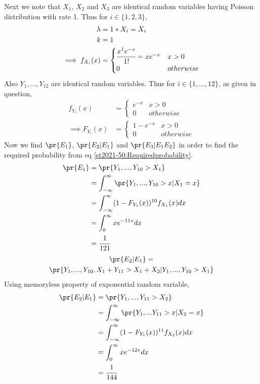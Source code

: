 Next we note that $X_1$, $X_2$ and $X_3$ are identical random variables having Poisson distribution with rate 1. Thus for $i \in \{1,2,3\}$,
\begin{align}
    \lambda &= 1*X_i = X_i\\
    k &= 1\\
    \implies f_{X_i}(x) &= 
    \begin{cases}
        \cfrac{x^1e^{-x}}{1!} = x e^{-x} &x > 0\\
        0                                &otherwise
    \end{cases}
\end{align}
Also $Y_1,...,Y_{12}$ are identical random variables. Thus for $i \in \{1,...,12\}$, as given in question,
\begin{align}
    f_{Y_i}(x) &= 
    \begin{cases}
        e^{-x} & x > 0\\
        0      & otherwise
    \end{cases}\\
    \implies F_{Y_i}(x) &= 
    \begin{cases}
        1-e^{-x} & x > 0\\
        0        & otherwise
    \end{cases}
\end{align}
Now we find $\pr{E_1}$, $\pr{E_2|E_1}$ and $\pr{E_3|E_1E_2}$ in order to find the required probability from eq \eqref{st2021-50:Requiredprobability}.
\begin{align}
    \pr{E_1} &= \pr{Y_1,...,Y_{10} > X_1}\\
             &= \int_{-\infty}^{\infty} \pr{Y_1,...,Y_{10} > x|X_1 = x}\\
             &= \int_{-\infty}^{\infty} (1-F_{Y_1}(x))^{10} f_{X_1}(x)dx\\
             &= \int_0^{\infty} xe^{-11x} dx\\
             &= \cfrac{1}{121}
\end{align}
\begin{multline}
    \pr{E_2|E_1} =\\
    \pr{Y_1,...,Y_{10},X_1+Y_{11} > X_1 + X_2|Y_1,...,Y_{10} > X_1}
\end{multline}
Using memoryless property of exponential random variable,
\begin{align}
    \pr{E_2|E_1} &= \pr{Y_1,...,Y_{11} > X_2}\\
                 &= \int_{-\infty}^{\infty} \pr{Y_1,...Y_{11} > x|X_2 = x}\\
                 &= \int_{-\infty}^{\infty} (1-F_{Y_1}(x))^{11} f_{X_2}(x)dx\\
                 &= \int_{0}^{\infty} x e^{-12x} dx\\
                 &= \cfrac{1}{144}
\end{align}
